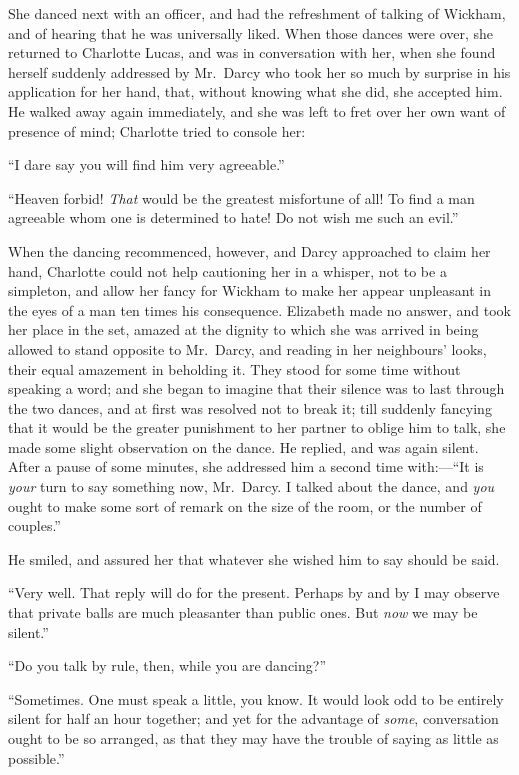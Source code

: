 \documentclass[12pt,english,oneside]{book}
\begin{document}
She danced next with an officer, and had the refreshment of talking
of Wickham, and of hearing that he was universally liked. When those
dances were over, she returned to Charlotte Lucas, and was in conversation
with her, when she found herself suddenly addressed by Mr.\ Darcy
who took her so much by surprise in his application for her hand,
that, without knowing what she did, she accepted him. He walked away
again immediately, and she was left to fret over her own want of presence
of mind; Charlotte tried to console her:

{}``I dare say you will find him very agreeable.''

{}``Heaven forbid! \textit{That} would be the greatest misfortune
of all! To find a man agreeable whom one is determined to hate! Do
not wish me such an evil.''

When the dancing recommenced, however, and Darcy approached to claim
her hand, Charlotte could not help cautioning her in a whisper, not
to be a simpleton, and allow her fancy for Wickham to make her appear
unpleasant in the eyes of a man ten times his consequence. Elizabeth
made no answer, and took her place in the set, amazed at the dignity
to which she was arrived in being allowed to stand opposite to Mr.\ Darcy,
and reading in her neighbours' looks, their equal amazement in beholding
it. They stood for some time without speaking a word; and she began
to imagine that their silence was to last through the two dances,
and at first was resolved not to break it; till suddenly fancying
that it would be the greater punishment to her partner to oblige him
to talk, she made some slight observation on the dance. He replied,
and was again silent. After a pause of some minutes, she addressed
him a second time with:\mbox{---}{}``It is \textit{your} turn to
say something now, Mr.\ Darcy. I talked about the dance, and \textit{you}
ought to make some sort of remark on the size of the room, or the
number of couples.''

He smiled, and assured her that whatever she wished him to say should
be said.

{}``Very well. That reply will do for the present. Perhaps by and
by I may observe that private balls are much pleasanter than public
ones. But \textit{now} we may be silent.''

{}``Do you talk by rule, then, while you are dancing?''

{}``Sometimes. One must speak a little, you know. It would look odd
to be entirely silent for half an hour together; and yet for the advantage
of \textit{some}, conversation ought to be so arranged, as that they
may have the trouble of saying as little as possible.''
\end{document}
